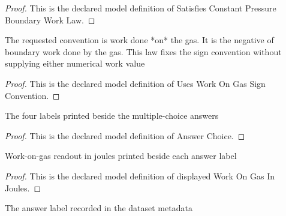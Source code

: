 \begin{proof}
  This is the declared model definition of Satisfies Constant Pressure Boundary Work Law.
\end{proof}
\begin{definition}
  \label{def:physics:phyx-mini-0403:phyxminiproblems-problemphyxmini0403-usesworkongassignconvention}
  The requested convention is work done *on* the gas. It is the negative of boundary work done by the gas. This law fixes the sign convention without supplying either numerical work value
\end{definition}
\begin{proof}
  This is the declared model definition of Uses Work On Gas Sign Convention.
\end{proof}
\begin{definition}
  \label{def:physics:phyx-mini-0403:phyxminiproblems-problemphyxmini0403-answerchoice}
  The four labels printed beside the multiple-choice answers
\end{definition}
\begin{proof}
  This is the declared model definition of Answer Choice.
\end{proof}
\begin{definition}
  \label{def:physics:phyx-mini-0403:phyxminiproblems-problemphyxmini0403-displayedworkongasinjoules}
  Work-on-gas readout in joules printed beside each answer label
\end{definition}
\begin{proof}
  This is the declared model definition of displayed Work On Gas In Joules.
\end{proof}
\begin{definition}
  \label{def:physics:phyx-mini-0403:phyxminiproblems-problemphyxmini0403-recordedanswerchoice}
  The answer label recorded in the dataset metadata
\end{definition}
